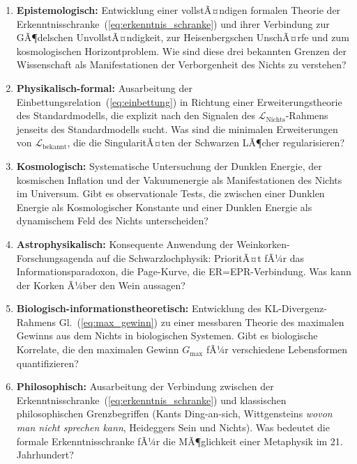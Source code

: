 ﻿\documentclass[12pt,a4paper]{report}
\begin{document}
\begin{enumerate}
	\item \textbf{Epistemologisch:} Entwicklung einer vollstÃ¤ndigen formalen Theorie der Erkenntnisschranke~(\ref{eq:erkenntnis_schranke}) und ihrer Verbindung zur GÃ¶delschen UnvollstÃ¤ndigkeit, zur Heisenbergschen UnschÃ¤rfe und zum kosmologischen Horizontproblem. Wie sind diese drei bekannten Grenzen der Wissenschaft als Manifestationen der Verborgenheit des Nichts zu verstehen?

	\item \textbf{Physikalisch-formal:} Ausarbeitung der Einbettungsrelation~(\ref{eq:einbettung}) in Richtung einer Erweiterungstheorie des Standardmodells, die explizit nach den Signalen des $\mathcal{L}_{\text{Nichts}}$-Rahmens jenseits des Standardmodells sucht. Was sind die minimalen Erweiterungen von $\mathcal{L}_{\text{bekannt}}$, die die SingularitÃ¤ten der Schwarzen LÃ¶cher regularisieren?

	\item \textbf{Kosmologisch:} Systematische Untersuchung der Dunklen Energie, der kosmischen Inflation und der Vakuumenergie als Manifestationen des Nichts im Universum. Gibt es observationale Tests, die zwischen einer Dunklen Energie als Kosmologischer Konstante und einer Dunklen Energie als dynamischem Feld des Nichts unterscheiden?

	\item \textbf{Astrophysikalisch:} Konsequente Anwendung der Weinkorken-Forschungsagenda auf die Schwarzlochphysik: PrioritÃ¤t fÃ¼r das Informationsparadoxon, die Page-Kurve, die ER=EPR-Verbindung. Was kann der Korken Ã¼ber den Wein aussagen?

	\item \textbf{Biologisch-informationstheoretisch:} Entwicklung des KL-Divergenz-Rahmens Gl.~(\ref{eq:max_gewinn}) zu einer messbaren Theorie des \glqq maximalen Gewinns aus dem Nichts\grqq{} in biologischen Systemen. Gibt es biologische Korrelate, die den maximalen Gewinn $G_{\max}$ fÃ¼r verschiedene Lebensformen quantifizieren?

	\item \textbf{Philosophisch:} Ausarbeitung der Verbindung zwischen der Erkenntnisschranke~(\ref{eq:erkenntnis_schranke}) und klassischen philosophischen Grenzbegriffen (Kants Ding-an-sich, Wittgensteins \textit{wovon man nicht sprechen kann}, Heideggers Sein und Nichts). Was bedeutet die formale Erkenntnisschranke fÃ¼r die MÃ¶glichkeit einer Metaphysik im 21. Jahrhundert?
\end{enumerate}
\end{document}

